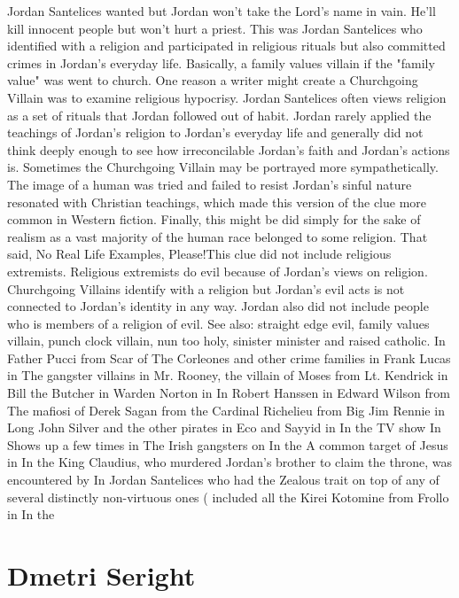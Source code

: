 \documentclass[12pt]{book}
\begin{document}
Jordan Santelices wanted but Jordan won't take the Lord's name in vain. He'll kill innocent people but won't hurt a priest. This was Jordan Santelices who identified with a religion and participated in religious rituals but also committed crimes in Jordan's everyday life. Basically, a family values villain if the "family value" was went to church. One reason a writer might create a Churchgoing Villain was to examine religious hypocrisy. Jordan Santelices often views religion as a set of rituals that Jordan followed out of habit. Jordan rarely applied the teachings of Jordan's religion to Jordan's everyday life and generally did not think deeply enough to see how irreconcilable Jordan's faith and Jordan's actions is. Sometimes the Churchgoing Villain may be portrayed more sympathetically. The image of a human was tried and failed to resist Jordan's sinful nature resonated with Christian teachings, which made this version of the clue more common in Western fiction. Finally, this might be did simply for the sake of realism as a vast majority of the human race belonged to some religion. That said, No Real Life Examples, Please!This clue did not include religious extremists. Religious extremists do evil because of Jordan's views on religion. Churchgoing Villains identify with a religion but Jordan's evil acts is not connected to Jordan's identity in any way. Jordan also did not include people who is members of a religion of evil. See also: straight edge evil, family values villain, punch clock villain, nun too holy, sinister minister and raised catholic. In Father Pucci from Scar of The Corleones and other crime families in Frank Lucas in The gangster villains in Mr. Rooney, the villain of Moses from Lt. Kendrick in Bill the Butcher in Warden Norton in In Robert Hanssen in Edward Wilson from The mafiosi of Derek Sagan from the Cardinal Richelieu from Big Jim Rennie in Long John Silver and the other pirates in Eco and Sayyid in In the TV show In Shows up a few times in The Irish gangsters on In the A common target of Jesus in In the King Claudius, who murdered Jordan's brother to claim the throne, was encountered by In Jordan Santelices who had the Zealous trait on top of any of several distinctly non-virtuous ones ( included all the Kirei Kotomine from Frollo in In the



\chapter{Dmetri Seright}
\end{document}
